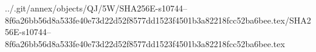 ../.git/annex/objects/QJ/5W/SHA256E-s10744--8f6a26bb56d8a533fe40e73d22d52f8577dd1523f4501b3a82218fcc52ba6bee.tex/SHA256E-s10744--8f6a26bb56d8a533fe40e73d22d52f8577dd1523f4501b3a82218fcc52ba6bee.tex